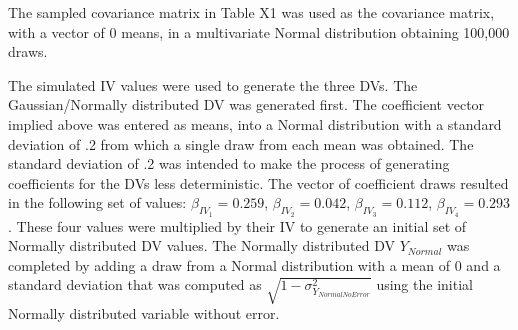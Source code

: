 \documentclass[ShortAfour,times,sageapa]{sagej}
\begin{document}
	\smallskip
	
	The sampled covariance matrix in Table X1 was used as the covariance matrix, with a vector of 0 means, in a  multivariate Normal distribution obtaining 100,000 draws.
	
	
	
	
%	
	
	The simulated IV values were used to generate the three DVs.  
	The Gaussian/Normally distributed DV was generated first. 
	The coefficient vector implied above was entered as means, into a Normal distribution with a standard deviation of .2 from which a single draw from each mean was obtained.  
	The standard deviation of .2 was intended to make the process of generating coefficients for the DVs less deterministic.  
	The vector of coefficient draws resulted in the following set of values: $\beta_{IV_1} = 0.259$, $\beta_{IV_2} = 0.042$, $\beta_{IV_3} = 0.112$, $\beta_{IV_4} = 0.293$.
	These four values were multiplied by their IV to generate an initial set of Normally distributed DV values.  
	The Normally distributed DV $Y_{Normal}$ was completed by adding a draw from a Normal distribution with a mean of 0 and a standard deviation that was computed as $\sqrt{1 - \sigma^2_{Y_{NormalNoError}}}$ using the initial Normally distributed variable without error.
	
	
	
%	
	
\end{document}
